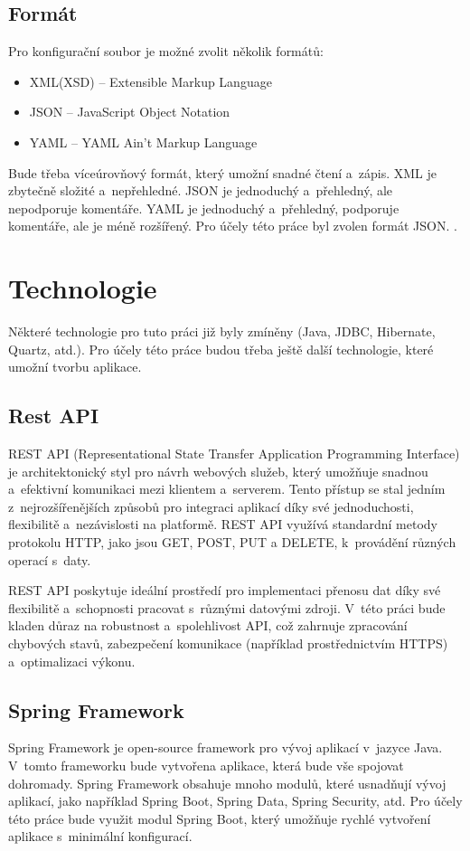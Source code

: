 \documentclass[czech, kiv, ba, he, iso690auyr, pdf]{fasthesis}
\begin{document}
\section{Formát}
Pro konfigurační soubor je možné zvolit několik formátů:
\begin{itemize}
    \item XML(XSD) -- Extensible Markup Language
    \item JSON -- JavaScript Object Notation
    \item YAML -- YAML Ain't Markup Language
\end{itemize}
Bude třeba víceúrovňový formát, který umožní snadné čtení a~zápis.
XML je zbytečně složité a~nepřehledné.
JSON je jednoduchý a~přehledný, ale nepodporuje komentáře.
YAML je jednoduchý a~přehledný, podporuje komentáře, ale je méně rozšířený.
Pro účely této práce byl zvolen formát JSON. \cite{cisco_xml_json_yaml}.

\chapter{Technologie}
Některé technologie pro tuto práci již byly zmíněny (Java, JDBC, Hibernate, Quartz, atd.).
Pro účely této práce budou třeba ještě další technologie, které umožní tvorbu aplikace.

\section{Rest API}
REST API (Representational State Transfer Application Programming Interface) je architektonický 
styl pro návrh webových služeb, který umožňuje snadnou a~efektivní komunikaci mezi klientem a~serverem. 
Tento přístup se stal jedním z~nejrozšířenějších způsobů pro integraci aplikací díky své jednoduchosti, 
flexibilitě a~nezávislosti na platformě. REST API využívá standardní metody protokolu HTTP, jako jsou 
GET, POST, PUT a DELETE, k~provádění různých operací s~daty.

REST API poskytuje ideální prostředí pro implementaci přenosu dat díky své flexibilitě a~schopnosti 
pracovat s~různými datovými zdroji. V~této práci bude kladen důraz na robustnost a~spolehlivost API, 
což zahrnuje zpracování chybových stavů, zabezpečení komunikace (například prostřednictvím HTTPS) 
a~optimalizaci výkonu.
\cite{rest_api}

\section{Spring Framework}
Spring Framework je open-source framework pro vývoj aplikací v~jazyce Java.
V~tomto frameworku bude vytvořena aplikace, která bude vše spojovat dohromady.
Spring Framework obsahuje mnoho modulů, které usnadňují vývoj aplikací, 
jako například Spring Boot, Spring Data, Spring Security, atd.
Pro účely této práce bude využit modul Spring Boot, který umožňuje rychlé 
vytvoření aplikace s~minimální konfigurací.
\cite{spring_framework}
\end{document}

